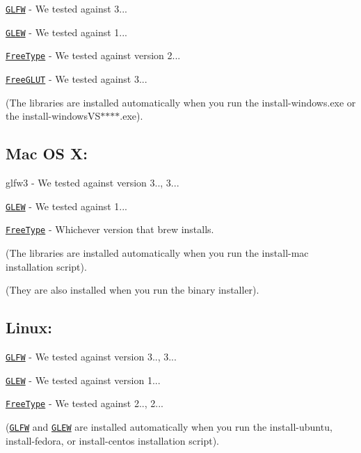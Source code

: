 \href{https://github.com/glfw/glfw/releases/download/3.1.1/glfw-3.1.1.zip}{\tt G\-L\-F\-W} -\/ We tested against 3...

\href{http://downloads.sourceforge.net/project/glew/glew/1.12.0/glew-1.12.0.zip}{\tt G\-L\-E\-W} -\/ We tested against 1...

\href{http://downloads.sourceforge.net/project/gnuwin32/freetype/2.3.5-1/freetype-2.3.5-1-bin.zip}{\tt Free\-Type} -\/ We tested against version 2...

\href{http://downloads.sourceforge.net/project/freeglut/freeglut/3.0.0/freeglut-3.0.0.tar.gz}{\tt Free\-G\-L\-U\-T} -\/ We tested against 3...

(The libraries are installed automatically when you run the install-\/windows.\-exe or the install-\/windows\-V\-S$\ast$$\ast$$\ast$$\ast$.exe).

\subsection*{Mac O\-S X\-:}

glfw3 -\/ We tested against version 3.., 3...

\href{http://downloads.sourceforge.net/project/glew/glew/1.12.0/glew-1.12.0.zip}{\tt G\-L\-E\-W} -\/ We tested against 1...

\href{http://downloads.sourceforge.net/project/gnuwin32/freetype/2.3.5-1/freetype-2.3.5-1-bin.zip}{\tt Free\-Type} -\/ Whichever version that brew installs.

(The libraries are installed automatically when you run the install-\/mac installation script).

(They are also installed when you run the binary installer).

\subsection*{Linux\-:}

\href{http://www.glfw.org/download.html}{\tt G\-L\-F\-W} -\/ We tested against version 3.., 3...

\href{http://glew.sourceforge.net/}{\tt G\-L\-E\-W} -\/ We tested against version 1...

\href{http://www.freetype.org/download.html}{\tt Free\-Type} -\/ We tested against 2.., 2...

(\href{http://www.glfw.org/download.html}{\tt G\-L\-F\-W} and \href{http://downloads.sourceforge.net/project/glew/glew/1.12.0/glew-1.12.0.zip}{\tt G\-L\-E\-W} are installed automatically when you run the install-\/ubuntu, install-\/fedora, or install-\/centos installation script).

